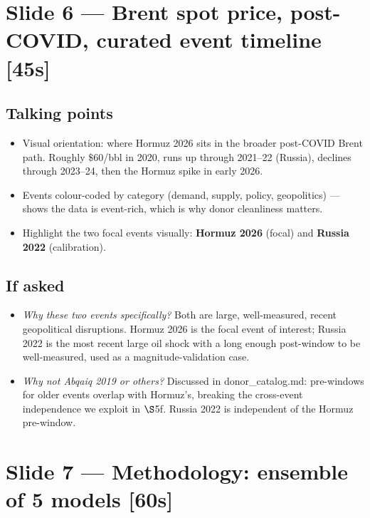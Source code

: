 \documentclass[11pt,a4paper]{article}
\newcommand{\timetag}[1]{\hfill\textcolor{muted}{\small[#1]}}
\newcommand{\highlight}[1]{\textcolor{accent}{\textbf{#1}}}
\begin{document}
\section{Slide 6 --- Brent spot price, post-COVID, curated event timeline \timetag{45s}}

\subsection{Talking points}
\begin{itemize}
  \item Visual orientation: where Hormuz 2026 sits in the broader post-COVID Brent path. Roughly $\$60$/bbl in 2020, runs up through 2021--22 (Russia), declines through 2023--24, then the Hormuz spike in early 2026.
  \item Events colour-coded by category (demand, supply, policy, geopolitics) --- shows the data is event-rich, which is why donor cleanliness matters.
  \item Highlight the two focal events visually: \highlight{Hormuz 2026} (focal) and \highlight{Russia 2022} (calibration).
\end{itemize}

\subsection{If asked}
\begin{itemize}
  \item \textit{Why these two events specifically?} Both are large, well-measured, recent geopolitical disruptions. Hormuz 2026 is the focal event of interest; Russia 2022 is the most recent large oil shock with a long enough post-window to be well-measured, used as a magnitude-validation case.
  \item \textit{Why not Abqaiq 2019 or others?} Discussed in donor\_catalog.md: pre-windows for older events overlap with Hormuz's, breaking the cross-event independence we exploit in $\S$5f. Russia 2022 is independent of the Hormuz pre-window.
\end{itemize}

\section{Slide 7 --- Methodology: ensemble of 5 models \timetag{60s}}
\end{document}
